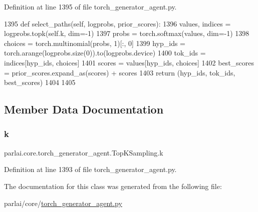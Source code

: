 Definition at line 1395 of file torch\+\_\+generator\+\_\+agent.\+py.


\begin{DoxyCode}
1395     \textcolor{keyword}{def }select\_paths(self, logprobs, prior\_scores):
1396         values, indices = logprobs.topk(self.k, dim=-1)
1397         probs = torch.softmax(values, dim=-1)
1398         choices = torch.multinomial(probs, 1)[:, 0]
1399         hyp\_ids = torch.arange(logprobs.size(0)).to(logprobs.device)
1400         tok\_ids = indices[hyp\_ids, choices]
1401         scores = values[hyp\_ids, choices]
1402         best\_scores = prior\_scores.expand\_as(scores) + scores
1403         \textcolor{keywordflow}{return} (hyp\_ids, tok\_ids, best\_scores)
1404 
1405 
\end{DoxyCode}


\subsection{Member Data Documentation}
\mbox{\label{classparlai_1_1core_1_1torch__generator__agent_1_1TopKSampling_a69d2f8e711e51151aa6649a4889e8243}} 
\subsubsection{\texorpdfstring{k}{k}}
{\footnotesize\ttfamily parlai.\+core.\+torch\+\_\+generator\+\_\+agent.\+Top\+K\+Sampling.\+k}



Definition at line 1393 of file torch\+\_\+generator\+\_\+agent.\+py.



The documentation for this class was generated from the following file\+:\begin{DoxyCompactItemize}
\item 
parlai/core/\hyperlink{torch__generator__agent_8py}{torch\+\_\+generator\+\_\+agent.\+py}\end{DoxyCompactItemize}
